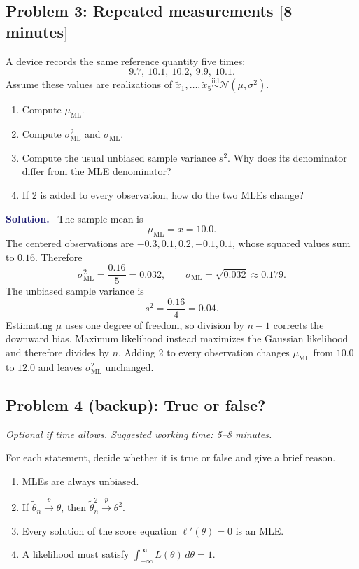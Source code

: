 \documentclass[11pt]{article}
\newif\ifsolutions
\newcommand{\iid}{\mathrel{\overset{\mathrm{iid}}{\sim}}}
\newcommand{\MLE}{\mathrm{ML}}
\newcommand{\rv}[1]{\widetilde{#1}}
\newenvironment{answer}{%
    \par\medskip\noindent\textcolor{MidnightBlue}{\textbf{Solution.}}\ }
    {\par\medskip}
\newcommand{\workingspace}[1]{}
\newcommand{\workingspace}[1]{\vspace{#1}}
\begin{document}
\subsection*{Problem 3: Repeated measurements \hfill [8 minutes]}
A device records the same reference quantity five times:
\[
  9.7,\ 10.1,\ 10.2,\ 9.9,\ 10.1.
\]
Assume these values are realizations of
$\rv{x}_1,\ldots,\rv{x}_5\iid\mathcal N(\mu,\sigma^2)$.
\begin{enumerate}[label=(\alph*),itemsep=0.35em]
  \item Compute $\mu_{\MLE}$.
  \item Compute $\sigma_{\MLE}^2$ and $\sigma_{\MLE}$.
  \item Compute the usual unbiased sample variance $s^2$. Why does its
        denominator differ from the MLE denominator?
  \item If 2 is added to every observation, how do the two MLEs change?
\end{enumerate}
\workingspace{6.0cm}

\begin{answer}
The sample mean is
\[
  \mu_{\MLE}=\overline x=10.0.
\]
The centered observations are $-0.3,0.1,0.2,-0.1,0.1$, whose squared values
sum to $0.16$. Therefore
\[
  \sigma_{\MLE}^2=\frac{0.16}{5}=0.032,
  \qquad
  \sigma_{\MLE}=\sqrt{0.032}\approx0.179.
\]
The unbiased sample variance is
\[
  s^2=\frac{0.16}{4}=0.04.
\]
Estimating $\mu$ uses one degree of freedom, so division by $n-1$ corrects the
downward bias. Maximum likelihood instead maximizes the Gaussian likelihood
and therefore divides by $n$. Adding 2 to every observation changes
$\mu_{\MLE}$ from $10.0$ to $12.0$ and leaves $\sigma_{\MLE}^2$ unchanged.
\end{answer}

\ifsolutions\else\newpage\fi
\subsection*{Problem 4 (backup): True or false?}
\noindent\textit{Optional if time allows. Suggested working time: 5--8 minutes.}

\noindent For each statement, decide whether it is true or false and give a brief reason.
\par\smallskip
\begin{enumerate}[label=(\alph*),itemsep=0.55em]
  \item MLEs are always unbiased.
  \item If $\rv{\theta}_n\xrightarrow{p}\theta$, then
        $\rv{\theta}_n^2\xrightarrow{p}\theta^2$.
  \item Every solution of the score equation $\ell'(\theta)=0$ is an MLE.
  \item A likelihood must satisfy
        $\int_{-\infty}^{\infty}L(\theta)\,d\theta=1$.
\end{enumerate}
\workingspace{4.5cm}
\end{document}
